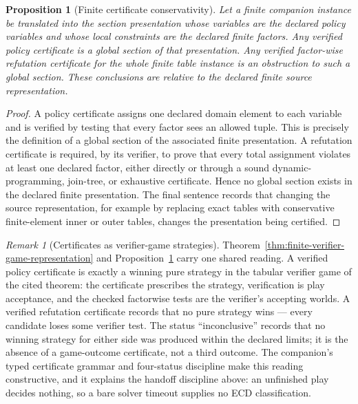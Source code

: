 \documentclass[11pt]{article}
\theoremstyle{plain}
\newtheorem{proposition}[theorem]{Proposition}
\theoremstyle{definition}
\theoremstyle{remark}
\newtheorem{remark}[theorem]{Remark}
\begin{document}
\begin{proposition}[Finite certificate conservativity]
\label{prop:finite-certificate-conservativity}
Let a finite companion instance be translated into the section presentation whose
variables are the declared policy variables and whose local constraints are the
declared finite factors. Any verified policy certificate is a global section of
that presentation. Any verified factor-wise refutation certificate for the whole
finite table instance is an obstruction to such a global section. These
conclusions are relative to the declared finite source representation.
\end{proposition}

\begin{proof}
A policy certificate assigns one declared domain element to each variable and is
verified by testing that every factor sees an allowed tuple. This is precisely
the definition of a global section of the associated finite presentation. A
refutation certificate is required, by its verifier, to prove that every total
assignment violates at least one declared factor, either directly or through a
sound dynamic-programming, join-tree, or exhaustive certificate. Hence no global
section exists in the declared finite presentation. The final sentence records
that changing the source representation, for example by replacing exact tables
with conservative finite-element inner or outer tables, changes the presentation
being certified.
\end{proof}

\begin{remark}[Certificates as verifier-game strategies]
\label{rem:certificate-verifier-game}
Theorem~\ref{thm:finite-verifier-game-representation} and
Proposition~\ref{prop:finite-certificate-conservativity} carry one shared
reading.  A verified policy certificate is exactly a winning pure strategy
in the tabular verifier game of the cited theorem: the certificate
prescribes the strategy, verification is play acceptance, and the checked
factorwise tests are the verifier's accepting worlds.  A verified
refutation certificate records that no pure strategy wins --- every
candidate loses some verifier test.  The status ``inconclusive'' records
that no winning strategy for either side was produced within the declared
limits; it is the absence of a game-outcome certificate, not a third
outcome.  The companion's typed certificate grammar and four-status
discipline make this reading constructive, and it explains the handoff
discipline above: an unfinished play decides nothing, so a bare solver
timeout supplies no ECD classification.
\end{remark}
\end{document}
